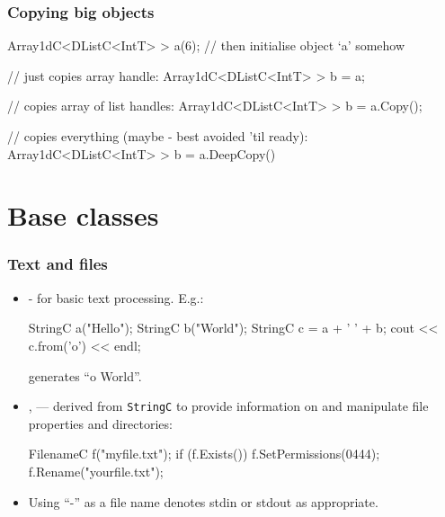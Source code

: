 \documentclass[landscape]{beamer}
\begin{document}
\begin{frame}[fragile]\frametitle{Copying big objects}

\begin{Code}[commandchars=\\\{\}]
  Array1dC<DListC<IntT> > a(6);
  // then initialise object `a' somehow
  
  // just copies array handle:
  Array1dC<DListC<IntT> > b = a;
\end{Code}
  
  {\pause}\begin{Code}[commandchars=\\\{\}]
  // copies array of list handles:
  Array1dC<DListC<IntT> > b = a.Copy(); 
  
\end{Code}
  
  {\pause}\begin{Code}[commandchars=\\\{\}]
  // copies everything (maybe - best avoided 'til ready):
  Array1dC<DListC<IntT> > b = a.DeepCopy() 
\end{Code}

\end{frame}



\section{Base classes}


\begin{frame}[fragile]\frametitle{Text and files}

  \begin{itemize}
  \item {} - for basic text processing.  \pause E.g.:

\begin{Code}
  StringC a("Hello");  StringC b("World");
  StringC c = a + ' ' + b;
  cout << c.from('o') << endl;
\end{Code}

generates ``o World''.

  \pause\item {},  --- derived from {\tt StringC} to provide information on and manipulate file properties and directories:

\begin{Code}
  FilenameC f("myfile.txt");
  if (f.Exists()) {
    f.SetPermissions(0444);
    f.Rename("yourfile.txt");
  }
\end{Code}  

  \pause\item Using ``-'' as a file name denotes stdin or stdout as appropriate.

  \end{itemize}

\end{frame}
\end{document}
